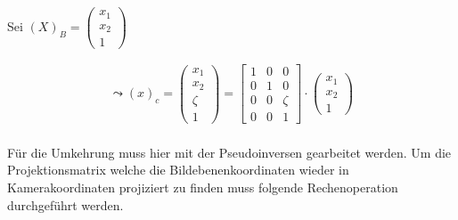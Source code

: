 		Sei $(X)_B = \begin{pmatrix}
		x_1\\x_2\\1
		\end{pmatrix}$
		
		\begin{gather}
		\leadsto (x)_c = \begin{pmatrix}
		x_1\\x_2\\\zeta\\1
		\end{pmatrix} 
		=
		\begin{bmatrix}
		1&0&0\\
		0&1&0\\
		0&0&\zeta\\
		0&0&1
		\end{bmatrix} \cdot
		\begin{pmatrix}
		x_1\\x_2\\1
		\end{pmatrix}
		\end{gather}\\
		
		Für die Umkehrung muss hier mit der Pseudoinversen gearbeitet werden. Um die Projektionsmatrix welche die Bildebenenkoordinaten wieder in Kamerakoordinaten projiziert zu finden muss folgende Rechenoperation durchgeführt werden. 
		
